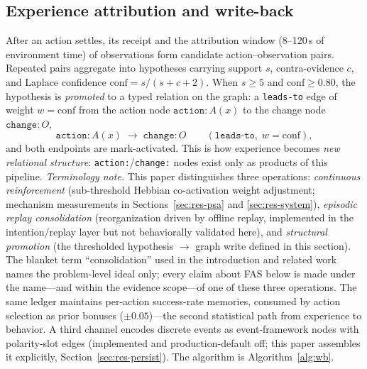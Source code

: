 \documentclass[10pt,a4paper]{article}
\begin{document}
\subsection{Experience attribution and write-back}
\label{sec:arch-wb}
After an action settles, its receipt and the attribution window (8--120\,s of environment time) of observations form candidate action--observation pairs. Repeated pairs aggregate into hypotheses carrying support $s$, contra-evidence $c$, and Laplace confidence $\mathrm{conf}=s/(s+c+2)$. When $s\ge 5$ and $\mathrm{conf}\ge 0.80$, the hypothesis is \emph{promoted} to a typed relation on the graph: a \texttt{leads-to} edge of weight $w=\mathrm{conf}$ from the action node $\mathtt{action:}A(x)$ to the change node $\mathtt{change:}O$,
\begin{equation}
\mathtt{action:}A(x) \;\longrightarrow\; \mathtt{change:}O \qquad (\texttt{leads-to},\; w{=}\mathrm{conf}),
\label{eq:wb}
\end{equation}
and both endpoints are mark-activated. This is how experience becomes \emph{new relational structure}: \texttt{action:}/\texttt{change:} nodes exist only as products of this pipeline. \emph{Terminology note.} This paper distinguishes three operations: \emph{continuous reinforcement} (sub-threshold Hebbian co-activation weight adjustment; mechanism measurements in Sections~\ref{sec:res-psa} and \ref{sec:res-system}), \emph{episodic replay consolidation} (reorganization driven by offline replay, implemented in the intention/replay layer but not behaviorally validated here), and \emph{structural promotion} (the thresholded hypothesis $\rightarrow$ graph write defined in this section). The blanket term ``consolidation'' used in the introduction and related work names the problem-level ideal only; every claim about FAS below is made under the name---and within the evidence scope---of one of these three operations. The same ledger maintains per-action success-rate memories, consumed by action selection as prior bonuses ($\pm0.05$)---the second statistical path from experience to behavior. A third channel encodes discrete events as event-framework nodes with polarity-slot edges (implemented and production-default off; this paper assembles it explicitly, Section~\ref{sec:res-persist}). The algorithm is Algorithm~\ref{alg:wb}.
\end{document}
